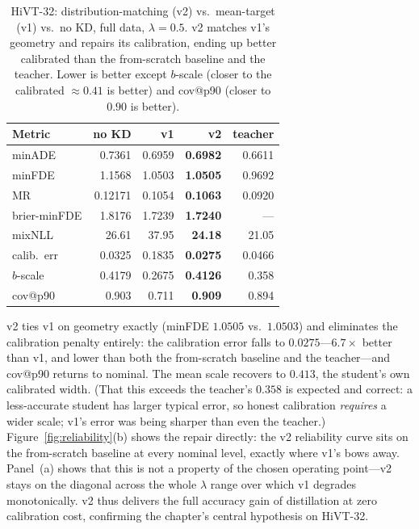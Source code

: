 \begin{table}[htbp]
  \centering
  \caption{HiVT-32: distribution-matching (v2) vs.\ mean-target (v1) vs.\ no KD,
    full data, $\lambda{=}0.5$. v2 matches v1's geometry and repairs its
    calibration, ending up better calibrated than the from-scratch baseline and the
    teacher. Lower is better except $b$-scale (closer to the calibrated $\approx
    0.41$ is better) and cov@p90 (closer to $0.90$ is better).}
  \label{tab:v2_32}
  \begin{tabular}{lrrrr}
    \toprule
    Metric & no KD & v1 & \textbf{v2} & teacher \\
    \midrule
    minADE       & 0.7361 & 0.6959 & \textbf{0.6982} & 0.6611 \\
    minFDE       & 1.1568 & 1.0503 & \textbf{1.0505} & 0.9692 \\
    MR           & 0.12171 & 0.1054 & \textbf{0.1063} & 0.0920 \\
    brier-minFDE & 1.8176 & 1.7239 & \textbf{1.7240} & --- \\
    mixNLL       & 26.61  & 37.95  & \textbf{24.18}  & 21.05 \\
    calib.\ err  & 0.0325 & 0.1835 & \textbf{0.0275} & 0.0466 \\
    $b$-scale    & 0.4179 & 0.2675 & \textbf{0.4126} & 0.358 \\
    cov@p90      & 0.903  & 0.711  & \textbf{0.909}  & 0.894 \\
    \bottomrule
  \end{tabular}
\end{table}

v2 ties v1 on geometry exactly (minFDE $1.0505$ vs.\ $1.0503$) and eliminates the
calibration penalty entirely: the calibration error falls to $0.0275$---$6.7\times$
better than v1, and lower than both the from-scratch baseline and the teacher---and
cov@p90 returns to nominal. The mean scale recovers to $0.413$, the student's own
calibrated width. (That this exceeds the teacher's $0.358$ is expected and correct:
a less-accurate student has larger typical error, so honest calibration
\emph{requires} a wider scale; v1's error was being sharper than even the teacher.)
Figure~\ref{fig:reliability}(b) shows the repair directly: the v2 reliability curve
sits on the from-scratch baseline at every nominal level, exactly where v1's bows
away. Panel~(a) shows that this is not a property of the chosen operating point---v2
stays on the diagonal across the whole $\lambda$ range over which v1 degrades
monotonically. v2 thus delivers the full accuracy gain of distillation at zero
calibration cost, confirming the chapter's central hypothesis on HiVT-32.


